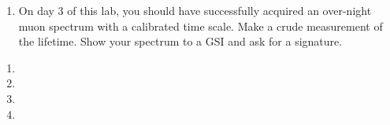 \documentclass{../signatures}
\begin{document}
\prelabsignatures

\pagebreak

\midlab

\begin{enumerate}

    \item On day 3 of this lab, you should have successfully acquired an over-night muon spectrum with a calibrated time scale. Make a crude measurement of the lifetime. Show your spectrum to a GSI and ask for a signature.
\\[36pt]
\end{enumerate}


\checkpointsection 

\begin{enumerate}

\item {}

\item {}

\item {}

\item {}

\end{enumerate}
\end{document}
